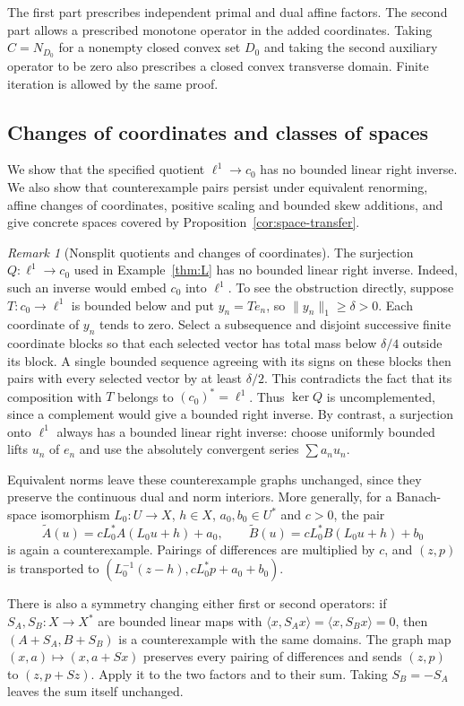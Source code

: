 \documentclass[11pt]{article}
\newcommand{\pair}[2]{\langle #1,#2\rangle}
\theoremstyle{definition}
\theoremstyle{remark}
\newtheorem{remark}{Remark}
\begin{document}
The first part prescribes independent primal and dual affine factors. The second part allows a prescribed monotone operator in the added coordinates. Taking $C=N_{D_0}$ for a nonempty closed convex set $D_0$ and taking the second auxiliary operator to be zero also prescribes a closed convex transverse domain. Finite iteration is allowed by the same proof.

\subsection{Changes of coordinates and classes of spaces}
\label{subsec:appendix-space-classes}

We show that the specified quotient $\ell^1\to c_0$ has no bounded linear right inverse. We also show that counterexample pairs persist under equivalent renorming, affine changes of coordinates, positive scaling and bounded skew additions, and give concrete spaces covered by Proposition~\ref{cor:space-transfer}.

\begin{remark}[Nonsplit quotients and changes of coordinates]
\label{rem:pullback-geometric-instances}
The surjection $Q:\ell^1\to c_0$ used in Example~\ref{thm:L} has no bounded linear right inverse. Indeed, such an inverse would embed $c_0$ into $\ell^1$. To see the obstruction directly, suppose $T:c_0\to\ell^1$ is bounded below and put $y_n=Te_n$, so $\|y_n\|_1\ge\delta>0$. Each coordinate of $y_n$ tends to zero. Select a subsequence and disjoint successive finite coordinate blocks so that each selected vector has total mass below $\delta/4$ outside its block. A single bounded sequence agreeing with its signs on these blocks then pairs with every selected vector by at least $\delta/2$. This contradicts the fact that its composition with $T$ belongs to $(c_0)^*=\ell^1$. Thus $\ker Q$ is uncomplemented, since a complement would give a bounded right inverse. By contrast, a surjection onto $\ell^1$ always has a bounded linear right inverse: choose uniformly bounded lifts $u_n$ of $e_n$ and use the absolutely convergent series $\sum a_nu_n$.

Equivalent norms leave these counterexample graphs unchanged, since they preserve the continuous dual and norm interiors. More generally, for a Banach-space isomorphism $L_0:U\to X$, $h\in X$, $a_0,b_0\in U^*$ and $c>0$, the pair
\[
\widetilde A(u)=cL_0^*A(L_0u+h)+a_0,
\qquad
\widetilde B(u)=cL_0^*B(L_0u+h)+b_0
\]
is again a counterexample. Pairings of differences are multiplied by $c$, and $(z,p)$ is transported to $(L_0^{-1}(z-h),cL_0^*p+a_0+b_0)$.

There is also a symmetry changing either first or second operators: if $S_A,S_B:X\to X^*$ are bounded linear maps with $\pair{x}{S_Ax}=\pair{x}{S_Bx}=0$, then $(A+S_A,B+S_B)$ is a counterexample with the same domains. The graph map $(x,a)\mapsto(x,a+Sx)$ preserves every pairing of differences and sends $(z,p)$ to $(z,p+Sz)$. Apply it to the two factors and to their sum. Taking $S_B=-S_A$ leaves the sum itself unchanged.
\end{remark}
\end{document}
